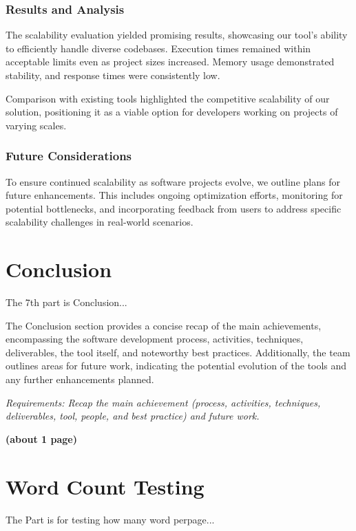 \documentclass[journal]{IEEEtran}
\begin{document}
\subsubsection{Results and Analysis}

The scalability evaluation yielded promising results, showcasing our tool's ability to efficiently handle diverse codebases. Execution times remained within acceptable limits even as project sizes increased. Memory usage demonstrated stability, and response times were consistently low.

Comparison with existing tools highlighted the competitive scalability of our solution, positioning it as a viable option for developers working on projects of varying scales.

\subsubsection{Future Considerations}

To ensure continued scalability as software projects evolve, we outline plans for future enhancements. This includes ongoing optimization efforts, monitoring for potential bottlenecks, and incorporating feedback from users to address specific scalability challenges in real-world scenarios.



\section{Conclusion}
\noindent The 7th part is Conclusion...

The Conclusion section provides a concise recap of the main achievements, encompassing the software development process, activities, techniques, deliverables, the tool itself, and noteworthy best practices. Additionally, the team outlines areas for future work, indicating the potential evolution of the tools and any further enhancements planned.

\textit{Requirements: Recap the main achievement (process, activities, techniques, deliverables, tool, people, and best practice) and future work.}

\textbf{(about 1 page)}


\newpage
\section*{Word Count Testing}
\noindent The Part is for testing how many word perpage...
\end{document}
